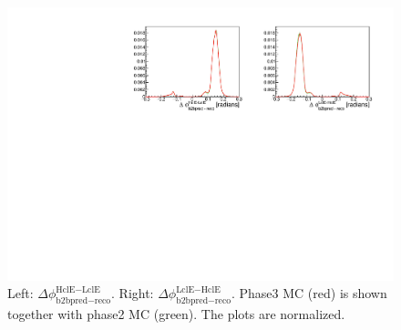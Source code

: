 \documentclass[a4paper,11pt,twosided,final,german,openbib,pdftex,listof=totoc,bibliography=totoc]{scrbook}
\begin{document}
\begin{appendix}
\begin{figure}[h!]
	\centering
	\includegraphics[width=\textwidth]{Plots/comp/cb2bMC.pdf}
	\caption[Normalized b2bClusterPhi - clusterPhi For Phase2 MC And Phase3 MC]{Left: $\Delta \phi _{\textrm{b2bpred} - \textrm{reco}}^{\textrm{HclE}-\textrm{LclE}}$. Right:  $\Delta \phi _{\textrm{b2bpred} - \textrm{reco}}^{\textrm{LclE}-\textrm{HclE}}$. Phase3 MC (red) is shown together with phase2 MC (green). The plots are normalized.}
	\label{fig:Cb2bMC}
\end{figure}

\end{appendix}
\end{document}
